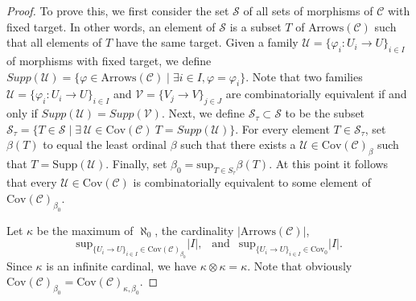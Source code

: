 \begin{proof}
To prove this, we first consider the set $\mathcal{S}$ of all
sets of morphisms of $\mathcal{C}$ with fixed target.
In other words, an element of $\mathcal{S}$ is a subset $T$
of $\text{Arrows}(\mathcal{C})$ such that all
elements of $T$ have the same target. Given a family
$\mathcal{U} = \{\varphi_i : U_i \to U\}_{i\in I}$ of morphisms with fixed
target, we define
$Supp(\mathcal{U}) = \{ \varphi \in \text{Arrows}(\mathcal{C})
\mid \exists i\in I, \varphi = \varphi_i\}$.
Note that two families $\mathcal{U} =  \{\varphi_i : U_i \to U\}_{i\in I}$
and $\mathcal{V} = \{V_j \to V\}_{j \in J}$ are combinatorially
equivalent if and only if $Supp(\mathcal{U}) = Supp(\mathcal{V})$.
Next, we define
$\mathcal{S}_\tau \subset \mathcal{S}$ to be the subset
$\mathcal{S}_\tau = \{ T \in \mathcal{S} \mid
\exists\ \mathcal{U} \in \text{Cov}(\mathcal{C}) \ T = Supp(\mathcal{U})\}$.
For every element $T \in \mathcal{S}_\tau$, set
$\beta(T)$ to equal the least ordinal $\beta$ such that
there exists a $\mathcal{U} \in \text{Cov}(\mathcal{C})_\beta$
such that $T = \text{Supp}(\mathcal{U})$. Finally, set
$\beta_0 = \text{sup}_{T \in S_\tau} \beta(T)$.
At this point it follows that every $\mathcal{U} \in \text{Cov}(\mathcal{C})$
is combinatorially equivalent to some element
of $\text{Cov}(\mathcal{C})_{\beta_0}$.

\medskip\noindent
Let $\kappa$ be the maximum of $\aleph_0$,
the cardinality $|\text{Arrows}(\mathcal{C})|$,
$$
\text{sup}_{\{U_i \to U\}_{i\in I} \in \text{Cov}(\mathcal{C})_{\beta_0}} |I|,
\ \ \text{ and }\ \
\text{sup}_{\{U_i \to U\}_{i\in I} \in \text{Cov}_0} |I|.
$$
Since $\kappa$ is an infinite cardinal, we have
$\kappa \otimes \kappa = \kappa$. Note that obviously
$\text{Cov}(\mathcal{C})_{\beta_0} =
\text{Cov}(\mathcal{C})_{\kappa, \beta_0}$.


\end{proof}
